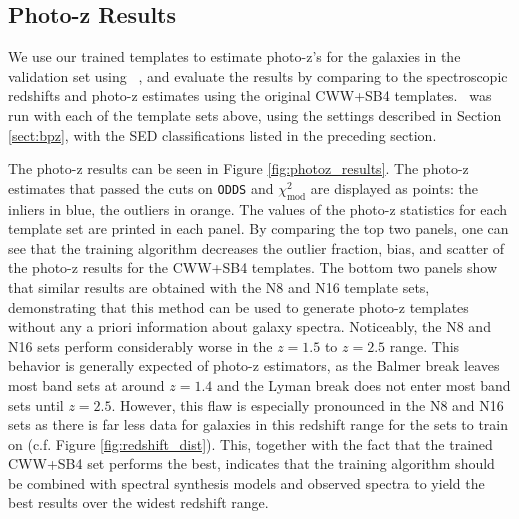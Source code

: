 


\subsection{Photo-z Results}
\label{sect:photoz_results}

We use our trained templates to estimate photo-z's for the galaxies in the validation set using \bpz\ \citep{Benitez2000a}, and evaluate the results by comparing to the spectroscopic redshifts and photo-z estimates using the original CWW+SB4 templates. 
\bpz\ was run with each of the template sets above, using the settings described in Section \ref{sect:bpz}, with the SED classifications listed in the preceding section. 

The photo-z results can be seen in Figure \ref{fig:photoz_results}.
The photo-z estimates that passed the cuts on \texttt{ODDS} and $\chi_\text{mod}^2$ are displayed as points: the inliers in blue, the outliers in orange.
The values of the photo-z statistics for each template set are printed in each panel.
By comparing the top two panels, one can see that the training algorithm decreases the outlier fraction, bias, and scatter of the photo-z results for the CWW+SB4 templates.
The bottom two panels show that similar results are obtained with the N8 and N16 template sets, demonstrating that this method can be used to generate photo-z templates without any a priori information about galaxy spectra.
Noticeably, the N8 and N16 sets perform considerably worse in the $z = 1.5$ to $z = 2.5$ range.
This behavior is generally expected of photo-z estimators, as the Balmer break leaves most band sets at around $z=1.4$ and the Lyman break does not enter most band sets until $z=2.5$.
However, this flaw is especially pronounced in the N8 and N16 sets as there is far less data for galaxies in this redshift range for the sets to train on (c.f. Figure \ref{fig:redshift_dist}).
This, together with the fact that the trained CWW+SB4 set performs the best, indicates that the training algorithm should be combined with spectral synthesis models and observed spectra to yield the best results over the widest redshift range.

